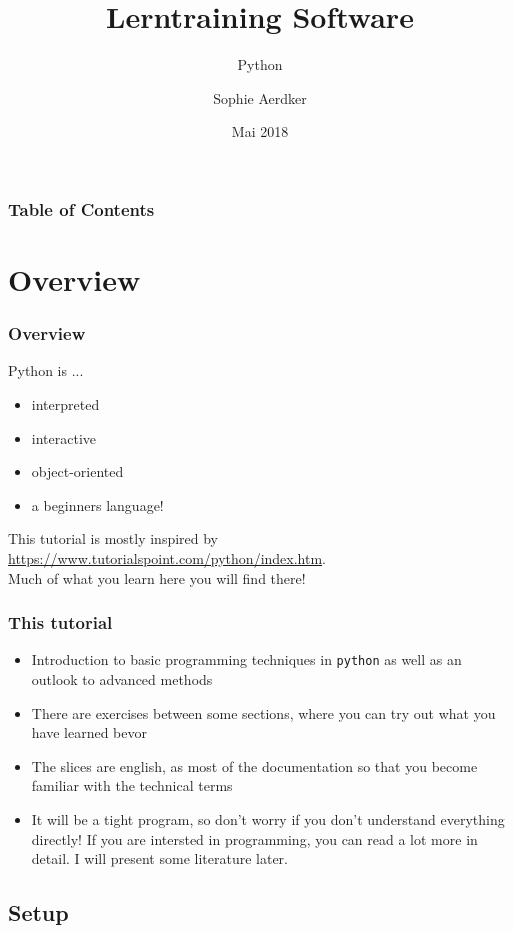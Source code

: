 \documentclass{beamer}
\title{Lerntraining Software}
\subtitle{Python}
\author{Sophie Aerdker}
\institute{Ruhr-Universit\"at Bochum}
\date{Mai 2018}
\begin{document}
 
\frame{\titlepage}
\begin{frame}
\frametitle{Table of Contents}
	\begin{multicols}{3}
 		 \tableofcontents
	\end{multicols}
\end{frame}

\section{Overview}

\begin{frame}
\frametitle{Overview}
	Python is ...\\
	\begin{itemize}
		\item interpreted
		\item interactive 
		\item object-oriented 
		\item a beginners language!
	\end{itemize}
	
	This tutorial is mostly inspired by \url{https://www.tutorialspoint.com/python/index.htm}. \\ Much of what you learn here you will find there!
\end{frame}

\begin{frame}
\frametitle{This tutorial}
	\begin{itemize}
		\item Introduction to basic programming techniques in \texttt{python} as well as an outlook to advanced methods
		\item There are exercises between some sections, where you can try out what you have learned bevor
		\item The slices are english, as most of the documentation so that you become familiar with the technical terms
		\item It will be a tight program, so don't worry if you don't understand everything directly! If you are intersted in programming, you can read a lot more in detail. I will present some literature later. 
	\end{itemize}
\end{frame}



\subsection{Setup}
\end{document}

